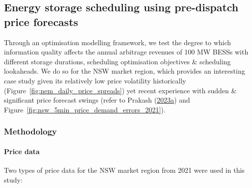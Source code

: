 \documentclass[12pt,a4paper,]{report}
\begin{document}
\hypertarget{sec:info-case_study-bess_simulations}{%
\subsection{Energy storage scheduling using pre-dispatch price
forecasts}\label{sec:info-case_study-bess_simulations}}

Through an optimisation modelling framework, we test the degree to which
information quality affects the annual arbitrage revenues of 100 MW
BESSs with different storage durations, scheduling optimisation
objectives \& scheduling lookaheads. We do so for the NSW market region,
which provides an interesting case study given its relatively low price
volatility historically (Figure~\ref{fig:nem_daily_price_spreads}) yet
recent experience with sudden \& significant price forecast swings
(refer to Prakash
(\protect\hyperlink{ref-prakashEnergyPriceConvergence2023}{2023a}) and
Figure~\ref{fig:nsw_5min_price_demand_errors_2021}).

\hypertarget{sec:info-case_study-bess_simulations-method}{%
\subsubsection{Methodology}\label{sec:info-case_study-bess_simulations-method}}

\hypertarget{sec:info-case_study-bess_simulations-method-price_data}{%
\paragraph{Price
data}\label{sec:info-case_study-bess_simulations-method-price_data}}

Two types of price data for the NSW market region from 2021 were used in
this study:
\end{document}

